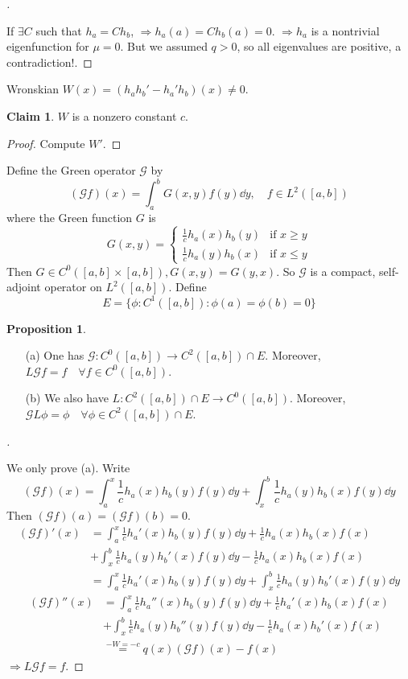 \documentclass{article}
\theoremstyle{definition}
\newtheorem{prop}{Proposition}
\newtheorem*{clm}{Claim}
\newenvironment{proofs}[1][\proofname]{%
  \begin{proof}[#1]$ $\par\nobreak\ignorespaces
}{%
  \end{proof}
}
\newcommand{\G}{\mathcal G}
\begin{document}
\begin{proofs}
	If $\exists C$ such that $h_a = C h_b$, $\Rightarrow h_a(a) = C h_b(a) = 0$.
	$\Rightarrow h_a$ is a nontrivial eigenfunction for $\mu = 0$.
	But we assumed $q > 0$, so all eigenvalues are positive, a contradiction!.
\end{proofs}

Wronskian $W(x) = (h_a h_b' - h_a' h_b)(x) \neq 0$.
\begin{clm}
	$W$ is a nonzero constant $c$.
\end{clm}
\begin{proof}
	Compute $W'$.
\end{proof}

Define the Green operator $\G$ by 
\[
	(\G f)(x) = \int_a^b G(x, y) f(y) \dd{y}, \quad f \in L^2([a, b])
\]
where the Green function $G$ is 
\[
	G(x, y) = 
	\begin{cases}
		\frac{1}{c} h_a(x) h_b(y) & \text{if } x \geq y\\
		\frac{1}{c} h_a(y) h_b(x) & \text{if } x \leq y
	\end{cases}
\]
Then $G \in C^0([a, b] \times [a, b]), G(x, y) = G(y, x)$.
So $\G$ is a compact, self-adjoint operator on $L^2([a, b])$.
Define 
\[
	E = \{ \phi: C^1([a, b]): \phi(a) = \phi(b) = 0\}
\]
\begin{prop}
	\begin{enumerate}
		\item[(a)] One has $\G : C^0([a, b]) \to C^2([a, b]) \cap E$.
			Moreover, $L \G f = f \quad \forall f \in C^0([a, b])$.

		\item[(b)] We also have $L:C^2([a, b]) \cap E \to C^0([a, b])$.
			Moreover, $\G L \phi = \phi \quad \forall \phi \in C^2([a, b]) \cap E$.
	\end{enumerate}
\end{prop}

\begin{proofs}
	We only prove (a).
	Write
	\[
		(\G f)(x) = \int_a^x \frac{1}{c} h_a(x) h_b(y) f(y) \dd{y} + \int_x^b \frac{1}{c} h_a(y) h_b(x) f(y) \dd{y}
	\]
	Then $(\G f)(a) = (\G f)(b) = 0$.
	\[
		\begin{split}
			(\G f)'(x) & = \int_a^x \frac{1}{c} h_a'(x) h_b(y) f(y) \dd{y} + \frac{1}{c} h_a(x) h_b(x) f(x)\\
			& + \int_x^b \frac{1}{c} h_a(y) h_b'(x) f(y) \dd{y} - \frac{1}{c} h_a(x) h_b(x) f(x)\\
			& = \int_a^x \frac{1}{c} h_a'(x) h_b(y) f(y) \dd{y} + \int_x^b \frac{1}{c} h_a(y) h_b'(x) f(y) \dd{y}
		\end{split}
	\]
	\[
		\begin{split}
			(\G f)''(x) & = \int_a^x \frac{1}{c} h_a''(x) h_b(y) f(y) \dd{y} + \frac{1}{c} h_a'(x) h_b(x) f(x)\\
			& + \int_x^b \frac{1}{c} h_a(y) h_b''(y) f(y) \dd{y} - \frac{1}{c} h_a(x) h_b'(x) f(x)\\
			& \stackrel{-W = -c}{=} q(x) (\G f)(x) - f(x)
		\end{split}
	\]
	$\Rightarrow L \G f = f$.
\end{proofs}
\end{document}
